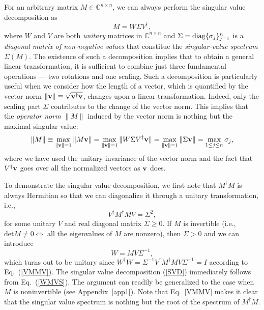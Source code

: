 \documentclass{tADP2e}
\theoremstyle{plain}
\theoremstyle{plain}
\theoremstyle{definition}
\begin{document}
For an arbitrary matrix $M\in\mathbb{C}^{n\times n}$, we can always perform the singular value decomposition as \cite{CDM00}
\begin{equation}
M=W\Sigma V^\dag,
\label{SVD}
\end{equation}
where $W$ and $V$ are both \emph{unitary} matrices in $\mathbb{C}^{n\times n}$ and $\Sigma={\rm diag}\{\sigma_j\}^n_{j=1}$ is a \emph{diagonal matrix of non-negative values} that constitue the \emph{singular-value spectrum} $\Sigma(M)$. The existence of such a decomposition implies that to obtain a general linear transformation, it is sufficient to combine just three fundamental operations --- two rotations and one scaling. Such a decomposition is particularly useful when we consider how the length of a vector, which is quantified by the vector norm $\|\bold{v}\|\equiv\sqrt{\bold{v}^\dag\bold{v}}$, changes upon a linear transformation. Indeed, only the scaling part $\Sigma$ contributes to the change of the vector norm. This implies that the \emph{operator norm} $\|M\|$ induced by the vector norm is nothing but the maximal singular value:
\begin{equation}
\|M\|\equiv\max_{\|\bold{v}\|=1}\|M\bold{v}\|=\max_{\|\bold{v}\|=1}\|W\Sigma V^\dag\bold{v}\|=\max_{\|\bold{v}\|=1}\|\Sigma\bold{v}\|=\max_{1\le j\le n}\sigma_j,
\label{Mnorm}
\end{equation}
where we have used the unitary invariance of the vector norm and the fact that $V^\dag\bold{v}$ goes over all the normalized vectors as $\bold{v}$ does.


To demonstrate the singular value decomposition, we first note that $M^\dag M$ is always Hermitian so that we can diagonalize it through a unitary transformation, i.e.,
\begin{equation}
V^\dag M^\dag MV = \Sigma^2,
\label{VMMV}
\end{equation}
for some unitary $V$ and real diagonal matrix $\Sigma\ge0$. If $M$ is invertible (i.e., $\mathrm{det}M\neq0\Leftrightarrow$ all the eigenvalues of $M$ are nonzero), then $\Sigma>0$ and we can introduce
\begin{equation}
W=MV\Sigma^{-1},
\label{WMVS}
\end{equation}
which turns out to be unitary since $W^\dag W=\Sigma^{-1}V^\dag M^\dag MV\Sigma^{-1}=I$ according to Eq.~(\ref{VMMV}). The singular value decomposition (\ref{SVD}) immediately follows from Eq.~(\ref{WMVS}). The argument can readily be generalized to the case when $M$ is noninvertible  (see Appendix~\ref{app1}). Note that Eq.~\eqref{VMMV} makes it clear that the singular value spectrum is nothing but the root of the spectrum of $M^\dag M$. 
\end{document}
